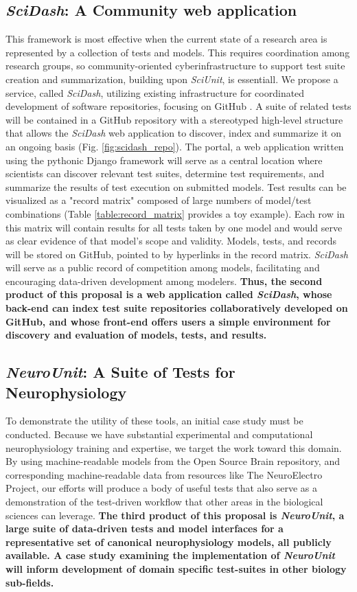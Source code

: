 \documentclass[11pt,letterpaper]{article}
\begin{document}
\subsection{\textit{SciDash}: A Community web application}
This framework is most effective when the current state of a research area is represented by a collection of tests and models. This requires coordination among research groups, so community-oriented cyberinfrastructure to support test suite creation and summarization, building upon \textit{SciUnit}, is essentiall. We propose a service, called \textit{SciDash}, utilizing existing infrastructure for coordinated development of software repositories, focusing on GitHub \cite{github_url} \cite{ram_git_2013}. A suite of related tests will be contained in a GitHub repository with a stereotyped high-level structure that allows the \textit{SciDash} web application to discover, index and summarize it on an ongoing basis (Fig. \ref{fig:scidash_repo}). The portal, a web application written using the pythonic Django framework \cite{django_url} will serve as a central location where scientists can discover relevant test suites, determine test requirements, and summarize the results of test execution on submitted models. Test results can be visualized as a "record matrix" composed of large numbers of model/test combinations (Table \ref{table:record_matrix} provides a toy example).  Each row in this matrix will contain results for all tests taken by one model and would serve as clear evidence of that model's scope and validity.  Models, tests, and records will be stored on GitHub, pointed to by hyperlinks in the record matrix. \textit{SciDash} will serve as a public record of competition among models, facilitating and encouraging data-driven development among modelers. \textbf{Thus, the second product of this proposal is a web application called \textit{SciDash}, whose back-end can index test suite repositories collaboratively developed on GitHub, and whose front-end offers users a simple environment for discovery and evaluation of models, tests, and results.}  

\subsection{\textit{NeuroUnit}: A Suite of Tests for Neurophysiology}\label{sec:neurounit}
To demonstrate the utility of these tools, an initial case study must be conducted. Because we have substantial experimental and computational neurophysiology training and expertise, we target the work toward this domain. By using machine-readable models from the Open Source Brain repository, and corresponding machine-readable data from resources like The NeuroElectro Project, our efforts will produce a body of useful tests that also serve as a demonstration of the test-driven workflow that other areas in the biological sciences can leverage.  \textbf{The third product of this proposal is \textit{NeuroUnit}, a large suite of data-driven tests and model interfaces for a representative set of canonical neurophysiology models, all publicly available. A case study examining the implementation of \textit{NeuroUnit} will inform development of domain specific test-suites in other biology sub-fields.}
\end{document}
